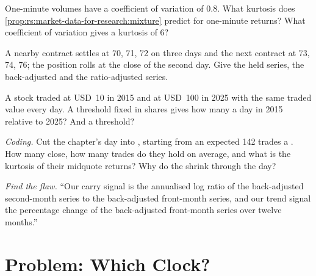 \begin{exercise}[$\star\star$]\label{exo:rs:market-data-for-research:4}
One-minute volumes have a coefficient of variation of 0.8. What kurtosis does \cref{prop:rs:market-data-for-research:mixture}
predict for one-minute returns? What coefficient of variation gives a kurtosis of 6?
\end{exercise}

\begin{exercise}[$\star\star$]\label{exo:rs:market-data-for-research:5}
A nearby contract settles at 70, 71, 72 on three days and the next contract at 73, 74, 76; the position rolls at the close of
the second day. Give the held series, the back-adjusted and the ratio-adjusted series.
\end{exercise}

\begin{exercise}[$\star\star$]\label{exo:rs:market-data-for-research:6}
A stock traded at USD~10 in 2015 and at USD~100 in 2025 with the same traded value every day. A  threshold fixed in
shares gives how many  a day in 2015 relative to 2025? And a  threshold?
\end{exercise}

\begin{exercise}[$\star\star\star$]\label{exo:rs:market-data-for-research:7}
\emph{Coding.} Cut the chapter's day into , starting from an expected 142 trades a . How many  close, how
many trades do they hold on average, and what is the kurtosis of their midquote returns? Why do the  shrink through the day?
\end{exercise}

\begin{exercise}[$\star\star\star$]\label{exo:rs:market-data-for-research:8}
\emph{Find the flaw.} ``Our carry signal is the annualised log ratio of the back-adjusted second-month series to the
back-adjusted front-month series, and our trend signal the percentage change of the back-adjusted front-month series over
twelve months.''
\end{exercise}

\section{Problem: Which Clock?}

